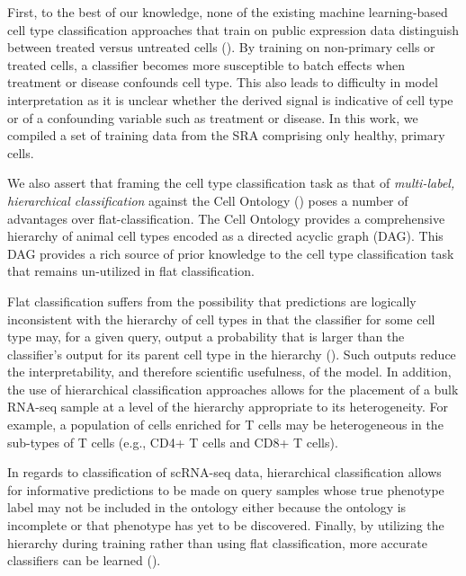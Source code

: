 First, to the best of our knowledge, none of the existing machine learning-based cell type classification approaches that train on public expression data distinguish between treated versus untreated cells (\citealp{Alavi2018, Cahan, Lee2013}). By training on non-primary cells or treated cells, a classifier becomes more susceptible to batch effects when treatment or disease confounds cell type. This also leads to difficulty in model interpretation as it is unclear whether the derived signal is indicative of cell type or of a confounding variable such as treatment or disease. In this work, we compiled a set of training data from the SRA comprising only healthy, primary cells.

We also assert that framing the cell type classification task as that of \textit{multi-label, hierarchical classification} against the Cell Ontology (\citealp{Bard}) poses a number of advantages over flat-classification. The Cell Ontology provides a comprehensive hierarchy of animal cell types encoded as a directed acyclic graph (DAG). This DAG provides a rich source of prior knowledge to the cell type classification task that remains un-utilized in flat classification.

Flat classification suffers from the possibility that predictions are logically inconsistent with the hierarchy of cell types in that the classifier for some cell type may, for a given query, output a probability that is larger than the classifier's output for its parent cell type in the hierarchy (\citealp{Obozinski2008}). Such outputs reduce the interpretability, and therefore scientific usefulness, of the model.  In addition, the use of hierarchical classification approaches allows for the placement of a bulk RNA-seq sample at a level of the hierarchy appropriate to its heterogeneity. For example, a population of cells enriched for T cells may be heterogeneous in the sub-types of T cells (e.g., CD4+ T cells and CD8+ T cells).  

In regards to classification of scRNA-seq data, hierarchical classification allows for informative predictions to be made on query samples whose true phenotype label may not be included in the ontology either because the ontology is incomplete or that phenotype has yet to be discovered. Finally, by utilizing the hierarchy during training rather than using flat classification, more accurate classifiers can be learned (\citealp{BarutcuogluSchapireTroyanskaya2006}). 


